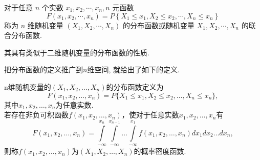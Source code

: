     \begin{definition}
        对于任意 $n$ 个实数 $x_1, x_2, \cdots, x_n, n$ 元函数
        $$
            F\left(x_1, x_2, \cdots, x_n\right)=P\left\{X_1 \leqslant x_1, X_2 \leqslant x_2, \cdots, X_n \leqslant x_n\right\}
        $$
        称为 $n$ 维随机变量 $\left(X_1, X_2, \cdots, X_n\right)$ 的分布函数或随机变量 $X_1, X_2, \cdots, X_n$ 的联合分布函数.
    \end{definition}
    其具有类似于二维随机变量的分布函数的性质.
    
    把分布函数的定义推广到$n$维空间, 就给出了如下的定义. 

\begin{definition}
    n维随机变量的$(X_1,X_2,\dots,X_n)$的分布函数定义为
     \[F(x_1,x_2,\dots,x_n) = P\{X_1 \leq x_1,X_2 \leq x_2,\dots,X_n \leq x_n\},\]
    其中\(x_1,x_2,\dots,x_n\)为任意实数.\\
    若存在非负可积函数$f(x_1,x_2,\dots,x_n)$，使对于任意实数$x_1,x_2,\dots,x_n$有
    \[F(x_1,x_2,\dots,x_n) = \int\limits_{-\infty}^{x_n}\int\limits_{-\infty}^{x_{n-1}} \dots \int\limits_{-\infty}^{x_1}f(x_1,x_2,\dots,x_n)d{x_1}d{x_2} \dots d{x_n},\]
    则称\(f(x_1,x_2,\dots,x_n)\)为\((X_1,X_2,\dots,X_n)\)的概率密度函数.
\end{definition}